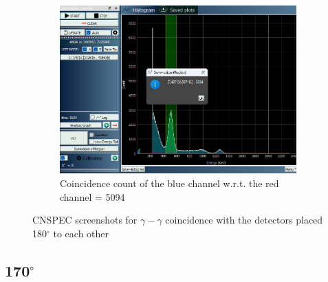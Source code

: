 \begin{figure}[H]
    \ContinuedFloat
    
    

    \begin{subfigure}{\linewidth}
        \centering
        \includegraphics[width=1\textwidth]{images/180/ccblue.png}
        \caption{Coincidence count of the blue channel w.r.t. the red channel = 5094}
    \end{subfigure}

    \caption{CNSPEC screenshots for $\gamma-\gamma$ coincidence with the detectors placed 180$^\circ$ to each other}
    \label{180}
\end{figure}

\subsection{170$^\circ$}

